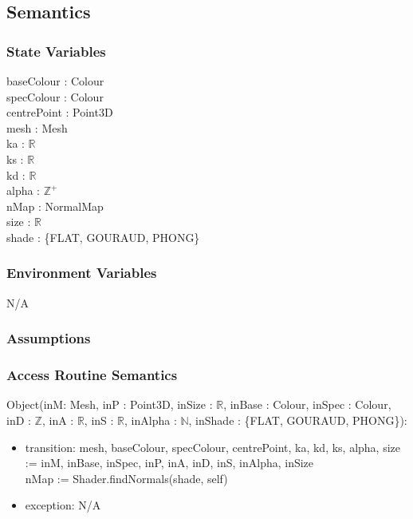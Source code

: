 \documentclass[12pt, titlepage]{article}
\begin{document}
\subsection{Semantics}
\subsubsection{State Variables}
baseColour : Colour \\
specColour : Colour \\
centrePoint : Point3D \\
mesh : Mesh \\
ka : $\mathbb{R}$ \\
ks : $\mathbb{R}$ \\
kd : $\mathbb{R}$ \\
alpha : $\mathbb{Z}^+$ \\
nMap : NormalMap \\
size : $\mathbb{R}$\\
shade : \{FLAT, GOURAUD, PHONG\}

\subsubsection{Environment Variables}
N/A

\subsubsection{Assumptions}

\subsubsection{Access Routine Semantics}
\noindent Object(inM: Mesh, inP : Point3D, inSize : 
$\mathbb{R}$,  inBase : Colour, inSpec : Colour, inD : $\mathbb{Z}$, inA : 
$\mathbb{R}$, inS : $\mathbb{R}$, inAlpha : $\mathbb{N}$, inShade : \{FLAT, 
GOURAUD, PHONG\}):
\begin{itemize}
	\item transition: mesh, baseColour, specColour, centrePoint, ka, kd, ks, 
	alpha, size := inM, inBase, inSpec, inP, inA, inD, inS, inAlpha, inSize\\
	nMap := Shader.findNormals(shade, self)
	\item exception: N/A
\end{itemize}
\end{document}
